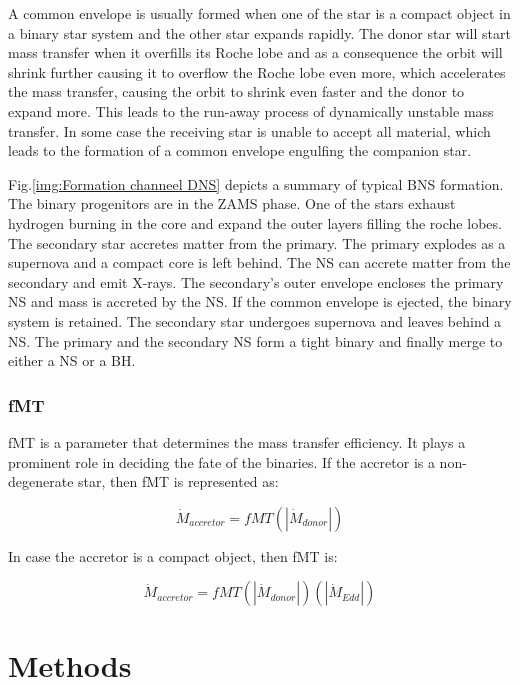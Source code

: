 \documentclass[preprint,12pt]{elsarticle}
\begin{document}
\newline
A common envelope is usually formed when one of the star is a compact object in a binary star system and the other star expands rapidly\citep{Iben:1993}. The donor star will start mass transfer when it overfills its Roche lobe and as a consequence the orbit will shrink further causing it to overflow the Roche lobe even more, which accelerates the mass transfer, causing the orbit to shrink even faster and the donor to expand more. This leads to the run-away process of dynamically unstable mass transfer. In some case the receiving star is unable to accept all material, which leads to the formation of a common envelope engulfing the companion star\citep{Ivanova:2013}.\newline


Fig.\ref{img:Formation channeel DNS} depicts a summary of typical BNS formation. The binary progenitors are in the ZAMS phase. One of the stars exhaust hydrogen burning in the core and expand the outer layers filling the roche lobes. The secondary star accretes matter from the primary. The primary explodes as a supernova and a compact core is left behind. The NS can accrete matter from the secondary and emit X-rays. The secondary's outer envelope encloses the primary NS and mass is accreted by the NS. If the common envelope is ejected, the binary system is retained. The secondary star undergoes supernova and leaves behind a NS. The primary and the secondary NS form a tight binary and finally merge to either a NS or a BH.


\subsubsection{\textbf{fMT}}
fMT is a parameter that determines the mass transfer efficiency. It plays a prominent role in deciding the fate of the binaries. If the accretor is a non-degenerate star, then fMT is represented as:

\begin{equation}
  \Dot{M}_{accretor}=fMT(|\Dot{M}_{donor}|)
\end{equation}

In case the accretor is a compact object, then fMT is:

\begin{equation}
  \Dot{M}_{accretor}=fMT(|\Dot{M}_{donor}|)(|\Dot{M}_{Edd}|)
\end{equation}


\section{Methods}
\end{document}

